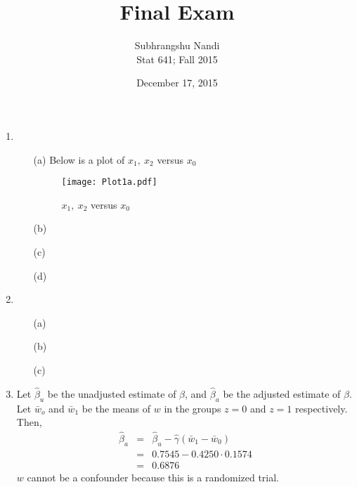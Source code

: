 \documentclass[11pt,a4paper]{article}
\begin{document}
\title{Final Exam}
\author{Subhrangshu Nandi\\
  Stat 641; Fall 2015}
\date{December 17, 2015}

\maketitle

\begin{enumerate}
\item 
\begin{enumerate}
\item[(a)] Below is a plot of $x_1,\ x_2$ versus $x_0$
\begin{figure}[H]
\begin{center}
\texttt{[image: Plot1a.pdf]}
\end{center}
\caption{$x_1,\ x_2$ versus $x_0$}
\end{figure}

\item[(b)] 
\item[(c)] 
\item[(d)] 
\end{enumerate}

\item
\begin{enumerate}
\item[(a)] 
\item[(b)] 
\item[(c)] 
\end{enumerate}

\item
Let $\hat{\beta}_u$ be the unadjusted estimate of $\beta$, and $\hat{\beta}_a$ be the adjusted estimate of $\beta$. Let $\bar{w}_o$ and $\bar{w}_1$ be the means of $w$ in the groups $z = 0$ and $z = 1$ respectively. Then,
\begin{eqnarray*}
\hat{\beta}_a & = & \hat{\beta}_u - \hat{\gamma}(\bar{w}_1 - \bar{w}_0) \\
              & = & 0.7545 - 0.4250 \cdot 0.1574 \\
              & = & 0.6876
\end{eqnarray*}
$w$ cannot be a confounder because this is a randomized trial.


\end{enumerate}
\end{document}
